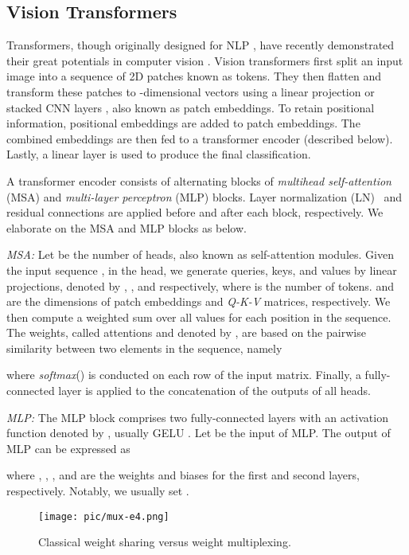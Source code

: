 \documentclass[10pt,twocolumn,letterpaper]{article}
\begin{document}
\subsection{Vision Transformers}
Transformers, though originally designed for NLP \cite{vaswani2017attention, bert, Albert}, have recently demonstrated their great potentials in computer vision \cite{ViT,deit,Swin}. 
Vision transformers first split an input image into a sequence of 2D patches known as tokens. 
They then flatten and transform these patches to -dimensional vectors using a linear projection \cite{ViT} or stacked CNN layers \cite{T2TViT}, also known as patch embeddings. To retain positional information, positional embeddings are added to patch embeddings.
The combined embeddings are then fed to a transformer encoder (described below). Lastly, a linear layer is used to produce the final classification.

A transformer encoder consists of alternating blocks of \textit{multihead self-attention} (MSA) and \textit{multi-layer perceptron} (MLP) blocks. Layer normalization (LN)~\cite{LN} and residual connections are applied before and after each block, respectively. We elaborate on the MSA and MLP blocks as below.

\noindent
\textit{MSA:}
Let  be the number of heads, also known as self-attention modules. Given the input sequence , in the  head, we generate queries, keys, and values by linear projections, denoted by , , and  respectively, where  is the number of tokens.  and  are the dimensions of patch embeddings and \textit{Q-K-V} matrices, respectively. We then compute a weighted sum over all values for each position in the sequence. The weights, called attentions and denoted by , are based on the pairwise similarity between two elements in the sequence, namely
\vspace{-3mm}
    
where \textit{softmax}() is conducted on each row of the input matrix. Finally, a fully-connected layer is applied to the concatenation of the outputs of all heads. 

\noindent
\textit{MLP: }
The MLP block comprises two fully-connected layers with an activation function denoted by , usually GELU \cite{gelu}. Let  be the input of MLP. The output of MLP can be expressed as

where , , , and  are the weights and biases for the first and second layers, respectively.
Notably, we usually set .

\begin{figure}[t]
         \vspace{-3mm}
\centering
        \texttt{[image: pic/mux-e4.png]}
        \vspace{-0.2cm}
        \caption{Classical weight sharing versus weight multiplexing.} 
        \vspace{-5mm}
    
        \label{fig:diagram}
    \end{figure}
\end{document}
